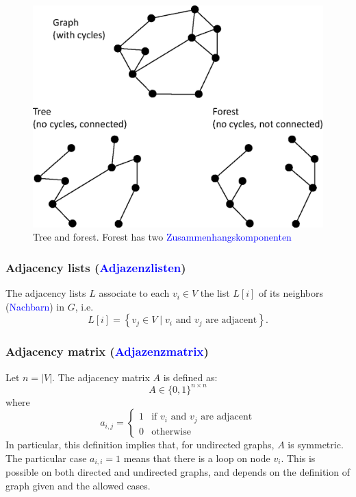 \documentclass[a4paper]{article}
\begin{document}
\begin{figure}[h]
    \centering
    \includegraphics[scale = 0.2]{Pictures/TreeAnDForest.png}
    \caption{Tree and forest. Forest has two \textcolor{blue}{Zusammenhangskomponenten}}
    \label{fig:tree/forest}
\end{figure}

\subsubsection{Adjacency lists (\textcolor{blue}{{Adjazenzlisten}})}
The adjacency lists $L$ associate to each $v_i \in V$ the list $L\left[i\right]$ of its neighbors (\textcolor{blue}{{Nachbarn}}) in $G$, i.e.
$$L\left[i\right] = \left\lbrace v_j \in V \mid v_i\text{ and }v_j\text{ are adjacent} \right\rbrace.$$


  
\subsubsection{Adjacency matrix (\textcolor{blue}{{Adjazenzmatrix}})}
Let $n=|V|$. The adjacency matrix $A$ is defined as:
$$A\in \{0,1\}^{n\times n}$$
where
$$a_{i,j}=\begin{cases} 1 & \text{if }v_i\text{ and }v_j\text{ are adjacent} \\ 0 & \text{otherwise} \end{cases}$$
In particular, this definition implies that, for undirected graphs, $A$ is symmetric.
The particular case $a_{i,i}=1$ means that there is a loop on node $v_i$. This is possible on both directed and undirected graphs, and depends on the definition of graph given and the allowed cases.
\end{document}
